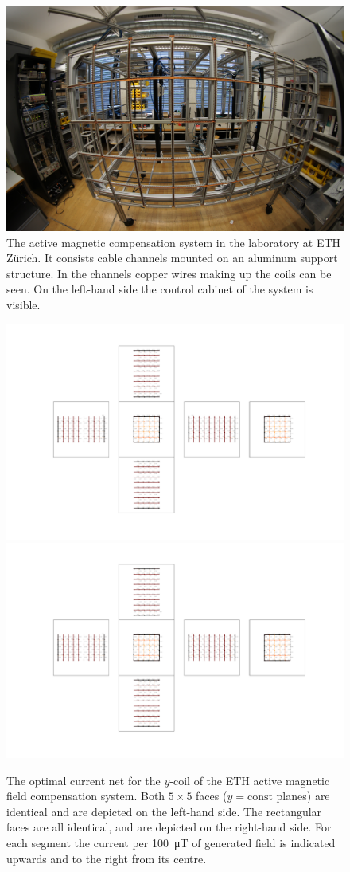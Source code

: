 \begin{figure}
  \centering
  \includegraphics[width=0.8\linewidth]{gfx/prototype/DSC03472.JPG}
  \caption{The active magnetic compensation system in the laboratory at ETH Zürich. It consists cable channels mounted on an aluminum support structure. In the channels copper wires making up the coils can be seen. On the left-hand side the control cabinet of the system is visible.}\label{fig:prototype_photo}
\end{figure}

\begin{figure}
  \centering
  \includegraphics[height=0.3\linewidth]{gfx/prototype/coil_design_y_100uT_1.pdf}
  \quad\quad
  \includegraphics[height=0.3\linewidth]{gfx/prototype/coil_design_y_100uT_2.pdf}
  \caption{The optimal current net for the $y$-coil of the ETH active magnetic field compensation system. Both $5 \times 5$ faces ($y = \mathrm{const}$ planes) are identical and are depicted on the left-hand side. The rectangular faces are all identical, and are depicted on the right-hand side. For each segment the current per \SI{100}{\micro\tesla} of generated field is indicated upwards and to the right from its centre.}\label{fig:prototype_coil_y_currents}
\end{figure}

